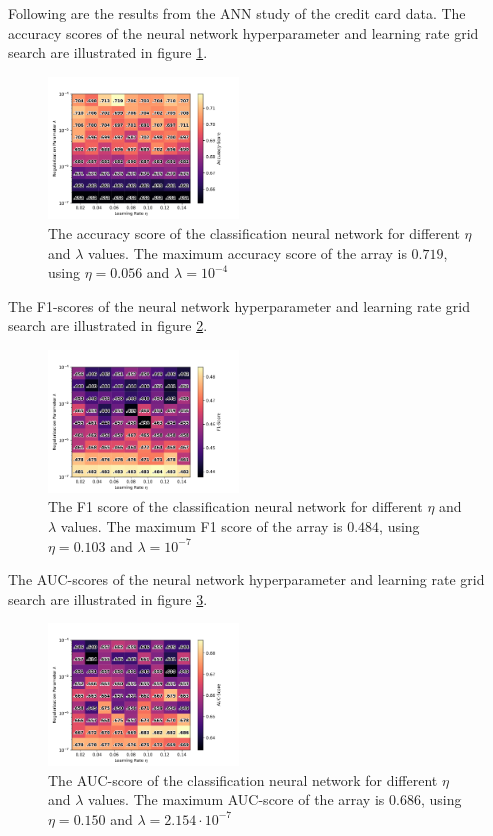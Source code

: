 		Following are the results from the ANN study of the credit card data. The accuracy scores of the neural network hyperparameter and learning rate grid search are illustrated in figure \ref{fig:cc_acc}.
		\begin{figure}[H]
			\centering
			\includegraphics[width=0.45\textwidth]{figures/cc_res_0.pdf}
			\caption{The accuracy score of the classification neural network for different $\eta$ and $\lambda$ values. The maximum accuracy score of the array is $0.719$, using $\eta=0.056$ and $\lambda=10^{-4}$}
			\label{fig:cc_acc}
		\end{figure}
		The F1-scores of the neural network hyperparameter and learning rate grid search are illustrated in figure \ref{fig:cc_F1}.
		\begin{figure}[H]
			\centering
			\includegraphics[width=0.45\textwidth]{figures/cc_res_1.pdf}
			\caption{The F1 score of the classification neural network for different $\eta$ and $\lambda$ values. The maximum F1 score of the array is $0.484$, using $\eta=0.103$ and $\lambda=10^{-7}$}
			\label{fig:cc_F1}
		\end{figure}
		The AUC-scores of the neural network hyperparameter and learning rate grid search are illustrated in figure \ref{fig:cc_auc}.
		\begin{figure}[H]
			\centering
			\includegraphics[width=0.45\textwidth]{figures/cc_res_2.pdf}
			\caption{The AUC-score of the classification neural network for different $\eta$ and $\lambda$ values. The maximum AUC-score of the array is $0.686$, using $\eta=0.150$ and $\lambda=2.154\cdot 10^{-7}$}
			\label{fig:cc_auc}
		\end{figure}
